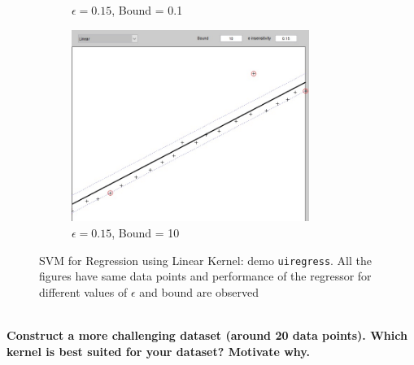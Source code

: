 \begin{figure}[ht]
\begin{subfigure}[b]{0.3\textwidth}
		\caption{$\epsilon = 0.15$, Bound = 0.1 }\label{fig:lin_E=0.15_B=0.1}
	\end{subfigure}%
	\begin{subfigure}[b]{0.3\textwidth}
		\centering
		\includegraphics[width = 0.85\textwidth]{Exercise2/Report/Ex2.1_E=0.15_B=10}
		\caption{$\epsilon = 0.15$, Bound = 10 }\label{fig:lin_E=0.15_B=10}
	\end{subfigure}
	\caption{SVM for Regression using Linear Kernel: demo \texttt{uiregress}. All the figures have same data points and performance of the regressor for different values of $\epsilon$ and bound are observed}
	\label{fig:uiregress_Linear}
\end{figure}\\
\textbf{Construct a more challenging dataset (around 20 data points). Which kernel is best
	suited for your dataset? Motivate why.}

